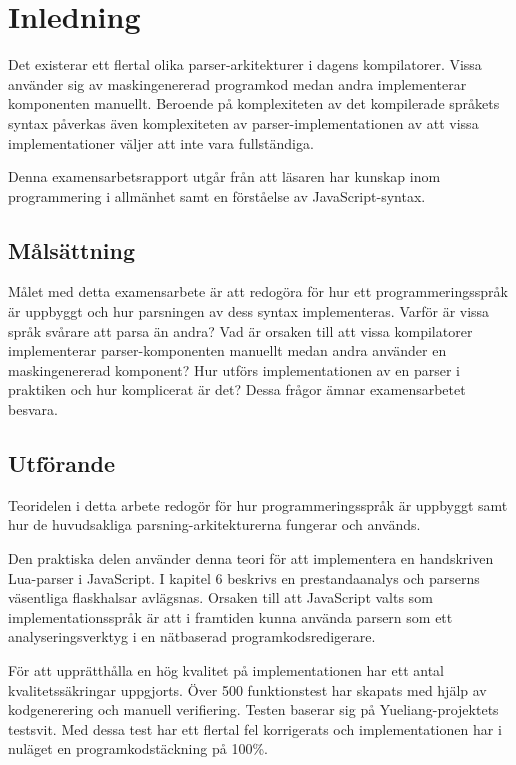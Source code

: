 \section{Inledning}

Det existerar ett flertal olika parser-arkitekturer i dagens kompilatorer.
Vissa använder sig av maskingenererad programkod medan andra implementerar
komponenten manuellt. Beroende på komplexiteten av det kompilerade språkets
syntax påverkas även komplexiteten av parser-implementationen av att
vissa implementationer väljer att inte vara fullständiga.

Denna examensarbetsrapport utgår från att läsaren har kunskap inom
programmering i allmänhet samt en förståelse av JavaScript-syntax.

\subsection{Målsättning}

Målet med detta examensarbete är att redogöra för hur ett programmeringsspråk
är uppbyggt och hur parsningen av dess syntax implementeras. Varför är vissa
språk svårare att parsa än andra? Vad är orsaken till att vissa kompilatorer
implementerar parser-komponenten manuellt medan andra använder en
maskingenererad komponent? Hur utförs implementationen av en parser i
praktiken och hur komplicerat är det? Dessa frågor ämnar examensarbetet
besvara.

\subsection{Utförande}

Teoridelen i detta arbete redogör för hur programmeringsspråk är uppbyggt
samt hur de huvudsakliga parsning-arkitekturerna fungerar och används.

Den praktiska delen använder denna teori för att implementera en handskriven
Lua-parser i JavaScript. I kapitel 6 beskrivs en prestandaanalys och parserns
väsentliga flaskhalsar avlägsnas. Orsaken till att JavaScript valts som
implementationsspråk är att i framtiden kunna använda parsern som ett
analyseringsverktyg i en nätbaserad programkodsredigerare.

För att upprätthålla en hög kvalitet på implementationen har ett antal
kvalitetssäkringar uppgjorts. Över 500 funktionstest har skapats med hjälp av
kodgenerering och manuell verifiering. Testen baserar sig på
Yueliang-projektets testsvit. Med dessa test har ett flertal fel korrigerats
och implementationen har i nuläget en programkodstäckning på 100\%.

